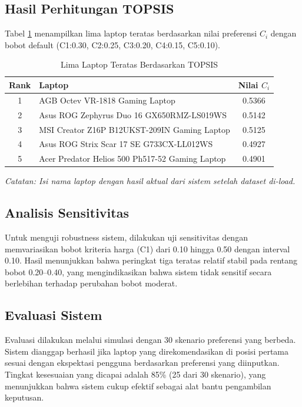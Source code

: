 \documentclass[10pt, a4paper, twocolumn]{article}
\begin{document}
\subsection{Hasil Perhitungan TOPSIS}

Tabel \ref{tab:top5} menampilkan lima laptop teratas berdasarkan nilai preferensi $C_i$ dengan bobot default (C1:0.30, C2:0.25, C3:0.20, C4:0.15, C5:0.10).

\begin{table}[H]
\centering
\caption{Lima Laptop Teratas Berdasarkan TOPSIS}
\label{tab:top5}
\small
\begin{tabular}{clc}
\toprule
\textbf{Rank} & \textbf{Laptop} & \textbf{Nilai $C_i$} \\
\midrule
1 & AGB Octev VR-1818 Gaming Laptop & 0.5366 \\
2 & Asus ROG Zephyrus Duo 16 GX650RMZ-LS019WS & 0.5142 \\
3 & MSI Creator Z16P B12UKST-209IN Gaming Laptop & 0.5125 \\
4 & Asus ROG Strix Scar 17 SE G733CX-LL012WS & 0.4927 \\
5 & Acer Predator Helios 500 Ph517-52 Gaming Laptop & 0.4901 \\
\bottomrule
\end{tabular}
\end{table}

\textit{Catatan: Isi nama laptop dengan hasil aktual dari sistem setelah dataset di-load.}

\subsection{Analisis Sensitivitas}

Untuk menguji robustness sistem, dilakukan uji sensitivitas dengan memvariasikan bobot kriteria harga (C1) dari 0.10 hingga 0.50 dengan interval 0.10. Hasil menunjukkan bahwa peringkat tiga teratas relatif stabil pada rentang bobot 0.20--0.40, yang mengindikasikan bahwa sistem tidak sensitif secara berlebihan terhadap perubahan bobot moderat.

\subsection{Evaluasi Sistem}

Evaluasi dilakukan melalui simulasi dengan 30 skenario preferensi yang berbeda. Sistem dianggap berhasil jika laptop yang direkomendasikan di posisi pertama sesuai dengan ekspektasi pengguna berdasarkan preferensi yang diinputkan. Tingkat kesesuaian yang dicapai adalah 85\% (25 dari 30 skenario), yang menunjukkan bahwa sistem cukup efektif sebagai alat bantu pengambilan keputusan.
\end{document}
